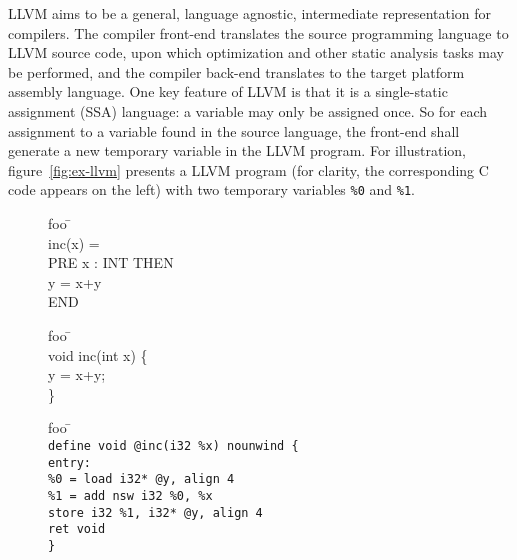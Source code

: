 \documentclass{llncs}
\newcommand{\llvm}[1]{\texttt{#1}}
\newcommand{\B}[1]{\textsf{#1}}
\begin{document}
LLVM aims to be a general, language agnostic, intermediate representation for
compilers. The compiler front-end translates the source programming language to
LLVM source code, upon which optimization and other static analysis tasks may be
performed, and the compiler back-end translates to the target platform assembly
language. One key feature of LLVM is that it is a single-static assignment (SSA)
language: a variable may only be assigned once. So for each assignment to a
variable found in the source language, the front-end shall generate a new
temporary variable in the LLVM program. For illustration,
figure~\ref{fig:ex-llvm} presents a LLVM program (for clarity, the corresponding
C code appears on the left) with two temporary variables \llvm{\%0} and
\llvm{\%1}.
\begin{figure}
\vspace*{-2.4em}
  \begin{minipage}[t]{.3\textwidth}
    \begin{tabbing}
      foo \= \kill  \\
      inc(x) =\\
      \B{PRE} x : INT \B{THEN}   \\
      \> 	y = x+y\\
      \B{END} \\
      \end{tabbing}
  \end{minipage}
  \:\vline\:
  \begin{minipage}[t]{.2\textwidth}
    \begin{tabbing}
      foo \= \kill  \\
      void inc(int x) \{\\
      \> 	y = x+y; \\
      \}\end{tabbing}
  \end{minipage}
	  \:\vline\:
  \begin{minipage}[t]{.6\textwidth}
    \begin{tabbing}
      foo \= \kill  \\
      \llvm{define void @inc(i32 \%x) nounwind \{} \\
      \llvm{entry:}                      \\
      \> \llvm{\%0 = load i32* @y, align 4}     \\
      \> \llvm{\%1 = add nsw i32 \%0, \%x}     \\
      \> \llvm{store i32 \%1, i32* @y, align 4} \\
      \> \llvm{ret void} \\
      \llvm{\}}
    \end{tabbing}


\end{minipage}
\end{figure}
\end{document}
